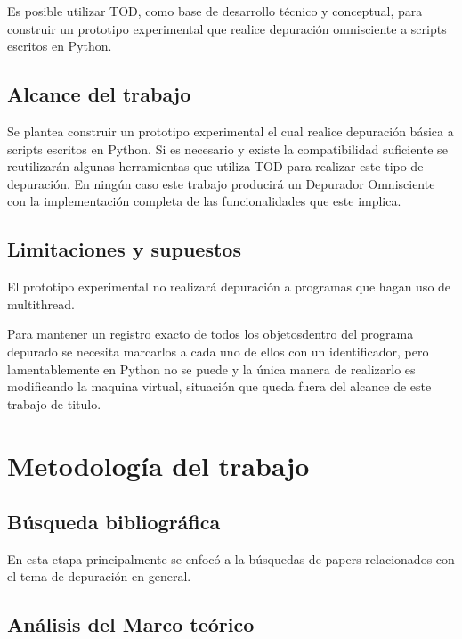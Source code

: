 \documentclass[12pt,legalpaper]{report}
\begin{document}
    Es posible utilizar TOD, como base de desarrollo técnico y conceptual, para construir un prototipo experimental que realice depuración omnisciente a scripts escritos en Python.

	\section{Alcance del trabajo}

    Se plantea construir un prototipo experimental el cual realice depuración básica a scripts escritos en Python. Si es necesario y existe la compatibilidad suficiente se reutilizarán algunas herramientas que utiliza TOD para realizar este tipo de depuración. En ningún caso este trabajo producirá un Depurador Omnisciente con la implementación completa de las funcionalidades que este implica.

	\section{Limitaciones y supuestos}

El prototipo experimental no realizará depuración a programas que hagan uso de multithread.

    Para mantener un registro exacto de todos los objetos\footnotemark[3] dentro del programa depurado se necesita marcarlos a cada uno de ellos con un identificador, pero lamentablemente en Python no se puede y la única manera de realizarlo es modificando la maquina virtual, situación que queda fuera del alcance de este trabajo de titulo.


\chapter{Metodología del trabajo}
	\section{Búsqueda bibliográfica}

En esta etapa principalmente se enfocó a la búsquedas de papers relacionados con el tema de depuración en general.

	\section{Análisis del Marco teórico}
\end{document}
